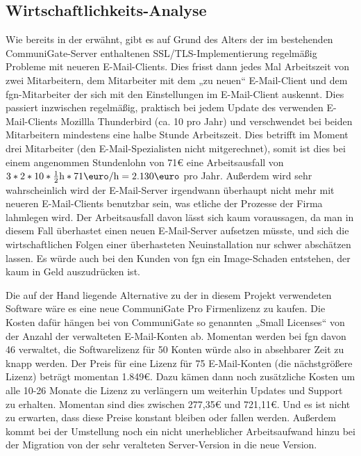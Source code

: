 \documentclass[11pt,a4paper,titlepage=firstiscover,headsepline,bibtotoc]{scrartcl} %
\begin{document}
\subsection{Wirtschaftlichkeits-Analyse}\label{sec:Erwin}
Wie bereits in der  erwähnt, gibt es auf Grund des Alters der im bestehenden CommuniGate-Server enthaltenen SSL/TLS-Implementierung regelmäßig Probleme mit neueren E-Mail-Clients. Dies frisst dann jedes Mal Arbeitszeit von zwei Mitarbeitern, dem Mitarbeiter mit dem „zu neuen“ E-Mail-Client und dem fgn-Mitarbeiter der sich mit den Einstellungen im E-Mail-Client auskennt. Dies passiert inzwischen regelmäßig, praktisch bei jedem Update des verwenden E-Mail-Clients Mozillla Thunderbird (ca. 10 pro Jahr) und verschwendet bei beiden Mitarbeitern mindestens eine halbe Stunde Arbeitszeit. Dies betrifft im Moment drei Mitarbeiter (den E-Mail-Spezialisten nicht mitgerechnet), somit ist dies bei einem angenommen Stundenlohn von 71\mbox{\euro} eine Arbeitsausfall von \(3*2*10*\frac{1}{2}\mbox{h}*71\mbox{\euro}/\mbox{h}=2.130\mbox{\euro}\) pro Jahr. Außerdem wird sehr wahrscheinlich wird der E-Mail-Server irgendwann überhaupt nicht mehr mit neueren E-Mail-Clients benutzbar sein, was etliche der Prozesse der Firma lahmlegen wird. Der Arbeitsausfall davon lässt sich kaum voraussagen, da man in diesem Fall überhastet einen neuen E-Mail-Server aufsetzen müsste, und sich die wirtschaftlichen Folgen einer überhasteten Neuinstallation nur schwer abschätzen lassen. Es würde auch bei den Kunden von fgn ein Image-Schaden entstehen, der kaum in Geld auszudrücken ist.

Die auf der Hand liegende Alternative zu der in diesem Projekt verwendeten Software wäre es eine neue CommuniGate Pro Firmenlizenz zu kaufen. Die Kosten dafür hängen bei von CommuniGate so genannten „Small Licenses“ von der Anzahl der verwalteten E-Mail-Konten ab. Momentan werden bei fgn davon 46 verwaltet, die Softwarelizenz für 50 Konten würde also in absehbarer Zeit zu knapp werden. Der Preis für eine Lizenz für 75 E-Mail-Konten (die nächstgrößere Lizenz) beträgt momentan 1.849\euro. Dazu kämen dann noch zusätzliche Kosten um alle 10-26 Monate die Lizenz zu verlängern um weiterhin Updates und Support zu erhalten. Momentan sind dies zwischen 277,35\euro{} und 721,11\euro. Und es ist nicht zu erwarten, dass diese Preise konstant bleiben oder fallen werden. Außerdem kommt bei der Umstellung noch ein nicht unerheblicher Arbeitsaufwand hinzu bei der Migration von der sehr veralteten Server-Version in die neue Version.
\end{document}
